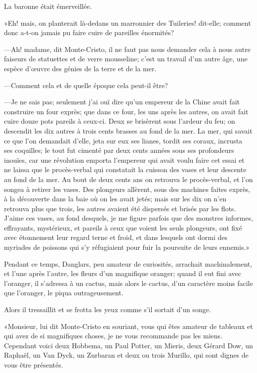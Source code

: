 La baronne était émerveillée. 

«Eh! mais, on planterait là-dedans un marronnier des Tuileries! dit-elle; comment donc a-t-on jamais pu faire cuire de pareilles énormités? 

—Ah! madame, dit Monte-Cristo, il ne faut pas nous demander cela à nous autre faiseurs de statuettes et de verre mousseline; c'est un travail d'un autre âge, une espèce d'œuvre des génies de la terre et de la mer. 

—Comment cela et de quelle époque cela peut-il être?  

—Je ne sais pas; seulement j'ai ouï dire qu'un empereur de la Chine avait fait construire un four exprès; que dans ce four, les uns après les autres, on avait fait cuire douze pots pareils à ceux-ci. Deux se brisèrent sous l'ardeur du feu; on descendit les dix autres à trois cents brasses au fond de la mer. La mer, qui savait ce que l'on demandait d'elle, jeta sur eux ses lianes, tordit ses coraux, incrusta ses coquilles; le tout fut cimenté par deux cents années sous ses profondeurs inouïes, car une révolution emporta l'empereur qui avait voulu faire cet essai et ne laissa que le procès-verbal qui constatait la cuisson des vases et leur descente au fond de la mer. Au bout de deux cents ans on retrouva le procès-verbal, et l'on songea à retirer les vases. Des plongeurs allèrent, sous des machines faites exprès, à la découverte dans la baie où on les avait jetés; mais sur les dix on n'en retrouva plus que trois, les autres avaient été dispersés et brisés par les flots. J'aime ces vases, au fond desquels, je me figure parfois que des monstres informes, effrayants, mystérieux, et pareils à ceux que voient les seuls plongeurs, ont fixé avec étonnement leur regard terne et froid, et dans lesquels ont dormi des myriades de poissons qui s'y réfugiaient pour fuir la poursuite de leurs ennemis.» 

Pendant ce temps, Danglars, peu amateur de curiosités, arrachait machinalement, et l'une après l'autre, les fleurs d'un magnifique oranger; quand il eut fini avec l'oranger, il s'adressa à un cactus, mais alors le cactus, d'un caractère moins facile que l'oranger, le piqua outrageusement. 

Alors il tressaillit et se frotta les yeux comme s'il sortait d'un songe. 

«Monsieur, lui dit Monte-Cristo en souriant, vous qui êtes amateur de tableaux et qui avez de si magnifiques choses, je ne vous recommande pas les miens. Cependant voici deux Hobbema, un Paul Potter, un Mieris, deux Gérard Dow, un Raphaël, un Van Dyck, un Zurbaran et deux ou trois Murillo, qui sont dignes de vous être présentés. 

